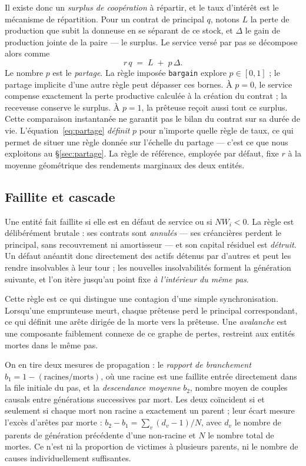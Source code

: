 Il existe donc un \emph{surplus de coopération} à répartir, et le taux
d'intérêt est le mécanisme de répartition. Pour un contrat de principal $q$,
notons $L$ la perte de production que subit la donneuse en se séparant de ce
stock, et $\Delta$ le gain de production jointe de la paire --- le surplus. Le
service versé par pas se décompose alors comme
\begin{equation}
r\,q \;=\; L \;+\; p\,\Delta.
\label{eq:partage}
\end{equation}
Le nombre $p$ est le \emph{partage}. La règle imposée \texttt{bargain} explore
$p\in[0,1]$ ; le partage implicite d'une autre règle peut dépasser ces bornes.
À $p = 0$, le service compense exactement la perte productive calculée
à la création du contrat ; la receveuse conserve le surplus. À $p = 1$,
la prêteuse reçoit aussi tout ce surplus. Cette comparaison instantanée
ne garantit pas le bilan du contrat sur sa durée de vie. L'équation~\eqref{eq:partage} \emph{définit} $p$ pour n'importe quelle
règle de taux, ce qui permet de situer une règle donnée sur l'échelle du
partage --- c'est ce que nous exploitons au §\ref{sec:partage}. La règle de
référence, employée par défaut, fixe $r$ à la moyenne géométrique des
rendements marginaux des deux entités.

\subsection{Faillite et cascade}
\label{sec:faillite}

Une entité fait faillite si elle est en défaut de service ou si $NW_i < 0$. La
règle est délibérément brutale : ses contrats sont \emph{annulés} --- ses
créancières perdent le principal, sans recouvrement ni amortisseur --- et son
capital résiduel est \emph{détruit}. Un défaut anéantit donc directement des
actifs détenus par d'autres et peut les rendre insolvables à leur tour ; les
nouvelles insolvabilités forment la génération suivante, et l'on itère
jusqu'au point fixe \emph{à l'intérieur du même pas}.

Cette règle est ce qui distingue une contagion d'une simple synchronisation.
Lorsqu'une emprunteuse meurt, chaque prêteuse perd le principal correspondant,
ce qui définit une arête dirigée de la morte vers la prêteuse. Une
\emph{avalanche} est une composante faiblement connexe de ce graphe de pertes,
restreint aux entités mortes dans le même pas.


On en tire deux mesures de propagation : le \emph{rapport de branchement}
$b_1 = 1 - (\text{racines}/\text{morts})$, où une racine est une faillite
entrée directement dans la file initiale du pas, et la \emph{descendance
moyenne} $b_2$, nombre moyen de couples causals entre générations successives
par mort. Les deux coïncident
si et seulement si chaque mort non racine a exactement un parent ; leur écart
mesure l'excès d'arêtes par morte : $b_2-b_1=\sum_v(d_v-1)/N$,
avec $d_v$ le nombre de parents de génération précédente d'une non-racine et
$N$ le nombre total de mortes. Ce n'est ni la proportion de victimes à plusieurs
parents, ni le nombre de causes individuellement suffisantes.
